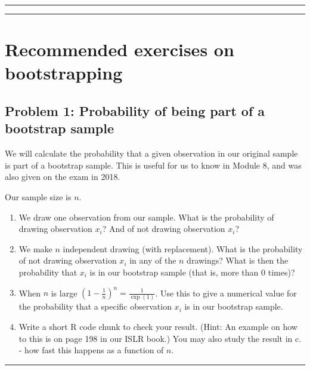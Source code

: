 \documentclass[]{article}
\providecommand{\tightlist}{%
  \setlength{\itemsep}{0pt}\setlength{\parskip}{0pt}}
\begin{document}
\begin{center}\rule{0.5\linewidth}{\linethickness}\end{center}

\begin{center}\rule{0.5\linewidth}{\linethickness}\end{center}

\section{Recommended exercises on
bootstrapping}\label{recommended-exercises-on-bootstrapping}

\subsection{Problem 1: Probability of being part of a bootstrap
sample}\label{problem-1-probability-of-being-part-of-a-bootstrap-sample}

We will calculate the probability that a given observation in our
original sample is part of a bootstrap sample. This is useful for us to
know in Module 8, and was also given on the exam in 2018.

Our sample size is \(n\).

\begin{enumerate}
\def\labelenumi{\alph{enumi}.}
\tightlist
\item
  We draw one observation from our sample. What is the probability of
  drawing observation \(x_i\)? And of not drawing observation \(x_i\)?
\item
  We make \(n\) independent drawing (with replacement). What is the
  probability of not drawing observation \(x_i\) in any of the \(n\)
  drawings? What is then the probability that \(x_i\) is in our
  bootstrap sample (that is, more than 0 times)?
\item
  When \(n\) is large \((1-\frac{1}{n})^n=\frac{1}{\exp(1)}\). Use this
  to give a numerical value for the probability that a specific
  observation \(x_i\) is in our bootstrap sample.
\item
  Write a short R code chunk to check your result. (Hint: An example on
  how to this is on page 198 in our ISLR book.) You may also study the
  result in c. - how fast this happens as a function of \(n\).
\end{enumerate}

\begin{center}\rule{0.5\linewidth}{\linethickness}\end{center}
\end{document}
